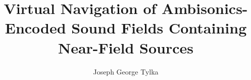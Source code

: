 \documentclass[12pt,lof,lot,twoside]{puthesis}
\title{Virtual Navigation of Ambisonics-Encoded Sound Fields Containing Near-Field Sources}
\author{Joseph George Tylka}
\begin{document}
\renewcommand\listfigurename{List of figures}
\renewcommand\listtablename{List of tables}

\makefrontmatter













\appendix %
%
%

\singlespacing
%
%
\sloppy
\printbibliography[heading=bibintoc]
\end{document}
